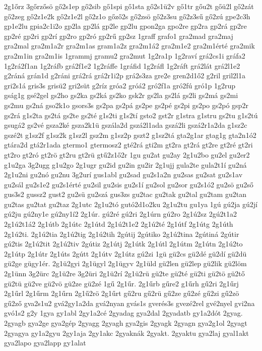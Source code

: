 {2g1őrz
3gőrzősö
gő2s1ep
gő2sib
gő1spi
gő1sta
gő2s1ü2v
gő1tr
gőu2t
gőü2l
gő2zát
gő2zeg
gő2z1e2k
gő2z1e2l
gő2z1o
gőző2s
gő2zsö
gő2z3su
gő2z3sű
gő2zú
gpe2c3h
gp1e2lu
gpia2c1i2o
gp2la
gp2lá
gp2le
gp2lu
gpon2ga
gpo2re
gp2ra
gp2rá
gp2re
gp2ré
gp2ri
gp2rí
gp2ro
gp2ró
gp2rű
gp2sz
1graff
grafo1
gra2mad
gra2maj
gra2mal
gra2m1a2r
gra2m1as
gram1a2z
gra2m1á2
gra2m1e2
gra2m1érté
gra2mik
gra2m1in
gra2m1is
1grammj
gramu2
gra2mut
1g2ra1p
1g2raví
grá2cs1i
gráfa2
1g2rá2f1an
1g2ráfb
grá2f1e2
1g2ráffe
1gráfid
1g2ráfl
1g2ráft
grá2lát
grá2l1e2
g2ráná
grán1d
g2ráni
grá2rá
grá2r1i2p
grá2s3za
gre2e
gren2d1ő2
g2ril
gril2l1a
gri2s1á
gris3s
grisü2
gri2süt
g2ríz
gróa2
gróá2
gró2f1a
gró2fú
gró1p
1g2rup
gság1g
gsé2gel
gs2ho
gs2ka
gs2ká
gs2ko
gsk2r
gs2la
gs2lá
gs2li
gs2má
gs2mi
gs2mu
gs2ná
gso2k1o
gsors3s
gs2pa
gs2pá
gs2pe
gs2pé
gs2pi
gs2po
gs2pó
gsp2r
gs2rá
g1s2ta
gs2tá
gs2te
gs2té
g1s2ti
g1s2tí
gsto2
gst2r
g1stra
g1stru
gs2tu
g1s2tú
gsugá2
gs2vé
gsza2ké
gsza2k1ü
gszála2d
gszá2l1ada
gszá2li
gszá2r1a2da
g1sz2c
gszé2t
g1sz2f
g1sz2k
g1sz2l
gsz2m
g1sz2p
gszt2
g1sz2tá
gta2g1ar
gtag1g
gta2n1ó2
gtára2d
gtá2r1ada
gtermo1
gtermosz2
gté2rá
gti2m
gt2ra
gt2rá
gt2re
gt2ré
gt2ri
gt2ro
gt2ró
gt2rö
gt2ru
gt2rü
gtű2z1ő2r
1gu
gu2at
gu2ay
2g1u2bo
gu2el
gu2er2
g1u2ga
3g2ugg
g1u2go
2g1ugr
gu2id
gu2in
gu2ir
2g1ujj
gula2te
gula2t1í
gu2ná
2g1u2ni
gu2nó
gu2nu
3g2urí
gus1abl
gu2sad
gu2s1a2n
gu2sas
gu2sat
gu2s1av
gu2sál
gu2s1e2
gu2s1érté
gu2sil
gu2sis
gu2s1í
gu2sol
gu2sor
gu2s1ó2
gu2sö
gu2ső
gus3s2
gussz2
gust2
gu2sü
gu2szá
gus3zs
gu2tac
gu2tak
gu2tal
gu2tam
gu2tan
gu2tas
gu2tat
gu2taz
2g1utc
2g1u2tó
gutó2d1o2ku
2g1u2tu
gu1ya
1gú
gú2ja
gú2jí
gú2ju
gú2ny1e
gú2ny1í2
2g1úr.
gú2ré
gú2ri
2g1úrn
gú2ro
2g1ú2sz
2gú2t1a2
2g1ú2t1á2
2g1útb
2g1útc
2g1útd
2g1ú2t1e2
2g1ú2té
2g1útf
2g1útg
2g1úth
2g1ú2ti.
2g1ú2tia
2g1ú2tig
2g1ú2tih
2gútij
2gútiko
2g1ú2tina
2gútiná
2gútir
gú2tis
2g1ú2tit
2g1ú2tiv
2gútiz
2g1útj
2g1útk
2g1útl
2g1útm
2g1útn
2g1ú2to
2g1útp
2g1útr
2g1úts
2gútt
2g1útv
2g1útz
gú2zi
1gü
gü2cs
gü2dé
gü2dí
gü2dü
gü2ge
gügy1ér.
2g1ü2gyi
2g1ügyl
2g1ügyv
2g1üld
gü2len
gü2lep
gü2lik
gü2löm
2g1ünn
3g2ürc
2g1ü2re
3g2üri
2g1ü2rí
2g1ü2rü
gü2te
gü2té
gü2ti
gü2tö
gü2tő
gü2tü
gü2ve
gü2vö
gü2ze
gü2zé
1gű
2g1űr.
2g1űrb
gűre2
g1űrh
gű2ri
2g1űrj
2g1űrl
2g1űrm
2g1űrn
2g1ű2rö
2g1űrt
gű2ru
gű2rü
gű2ze
gű2zé
gű2zi
gű2zö
gű2ző
gva2s1u2
gvá2gy1a2da
gvá2nyan
gvás1s
gverés3s
gvezé2rel
gvé2nyel
gvi2na
gvó1s2
g2y
1gya
gy1abl
2gy1a2cé
2gyadag
gya2dal
2gyadatb
gy1a2dót
2gyag.
2gyagb
gya2ge
gya2gép
2gyagg
2gyagh
gya2gis
2gyagk
2gyagn
gya2g1ol
2gyagt
2gyagya
gy1a2gyu
2gy1aja
2gy1akc
2gyaknák
2gyakt.
2gyaktu
gya2laj
gyal1akt
gya2lapo
gya2lapp
gy1alat
}
